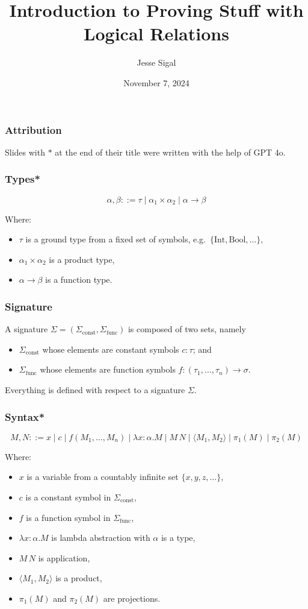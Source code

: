 \documentclass[aspectratio=169]{beamer}
\title{Introduction to Proving Stuff\textsuperscript{\texttrademark} with Logical Relations}
\author{Jesse Sigal}
\date{November 7, 2024}
\begin{document}
\begin{frame}
\titlepage
\end{frame}

\begin{frame}
\frametitle{Attribution}
Slides with $*$ at the end of their title were written with the help of GPT 4o.
\end{frame}

\begin{frame}
\frametitle{Types*}
\[
\alpha, \beta ::= \tau \mid \alpha_1 \times \alpha_2 \mid \alpha \rightarrow \beta
\]

Where:
\begin{itemize}
    \item $\tau$ is a ground type from a fixed set of symbols, e.g.\ $\{\text{Int}, \text{Bool}, \ldots\},$
    \item $\alpha_1 \times \alpha_2$ is a product type,
    \item $\alpha \rightarrow \beta$ is a function type.
\end{itemize}
\end{frame}

\begin{frame}
\frametitle{Signature}
A signature $\Sigma = (\Sigma_{\text{const}}, \Sigma_{\text{func}})$ is composed of two sets, namely
\begin{itemize}
    \item $\Sigma_{\text{const}}$ whose elements are constant symbols $c : \tau$; and
    \item $\Sigma_{\text{func}}$ whose elements are function symbols $f : (\tau_1, \ldots, \tau_n) \to \sigma$.
\end{itemize}
Everything is defined with respect to a signature $\Sigma$.

\end{frame}

\begin{frame}
\frametitle{Syntax*}

\[
M, N ::= x \mid c \mid f(M_1, \ldots, M_n) \mid \lambda x: \alpha. M \mid M \, N \mid \langle M_1, M_2 \rangle \mid \pi_1(M) \mid \pi_2(M)
\]

Where:
\begin{itemize}
    \item $x$ is a variable from a countably infinite set $\{x, y, z, \ldots \}$,
    \item $c$ is a constant symbol in $\Sigma_{\text{const}}$,
    \item $f$ is a function symbol in $\Sigma_{\text{func}}$,
    \item $\lambda x: \alpha. M$ is lambda abstraction with $\alpha$ is a type,
    \item $M\, N$ is application,
    \item $\langle M_1, M_2 \rangle$ is a product,
    \item $\pi_1(M)$ and $\pi_2(M)$ are projections.
\end{itemize}
\end{frame}
\end{document}
